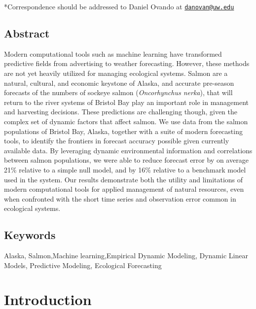 \documentclass[
]{article}
\begin{document}
*Correspondence should be addressed to Daniel Ovando at \href{mailto:danovan@uw.edu}{\nolinkurl{danovan@uw.edu}}

\newpage

\hypertarget{abstract}{%
\subsection*{Abstract}\label{abstract}}

Modern computational tools such as machine learning have transformed predictive fields from advertising to weather forecasting. However, these methods are not yet heavily utilized for managing ecological systems. Salmon are a natural, cultural, and economic keystone of Alaska, and accurate pre-season forecasts of the numbers of sockeye salmon (\emph{Oncorhynchus nerka}), that will return to the river systems of Bristol Bay play an important role in management and harvesting decisions. These predictions are challenging though, given the complex set of dynamic factors that affect salmon. We use data from the salmon populations of Bristol Bay, Alaska, together with a suite of modern forecasting tools, to identify the frontiers in forecast accuracy possible given currently available data. By leveraging dynamic environmental information and correlations between salmon populations, we were able to reduce forecast error by on average 21\% relative to a simple null model, and by 16\% relative to a benchmark model used in the system. Our results demonstrate both the utility and limitations of modern computational tools for applied management of natural resources, even when confronted with the short time series and observation error common in ecological systems.

\hypertarget{keywords}{%
\subsection*{Keywords}\label{keywords}}

Alaska, Salmon,Machine learning,Empirical Dynamic Modeling, Dynamic Linear Models, Predictive Modeling, Ecological Forecasting

\newpage

\hypertarget{introduction}{%
\section*{Introduction}\label{introduction}}
\end{document}
